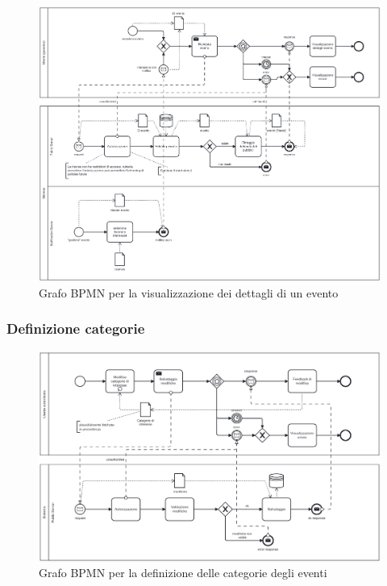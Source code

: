 \documentclass{article}
\begin{document}
\begin{figure}[htbp]
    \label{7.1.4}
    \centering
    \includegraphics[width=1\textwidth]{Images/BPMN - details.png}
    \caption{Grafo BPMN per la visualizzazione dei dettagli di un evento}
\end{figure}

\clearpage

\subsubsection{Definizione categorie}

\begin{figure}[htbp]
    \label{7.1.5}
    \centering
    \includegraphics[width=1\textwidth]{Images/BPMN - categories.png}
    \caption{Grafo BPMN per la definizione delle categorie degli eventi}
\end{figure}
\end{document}
